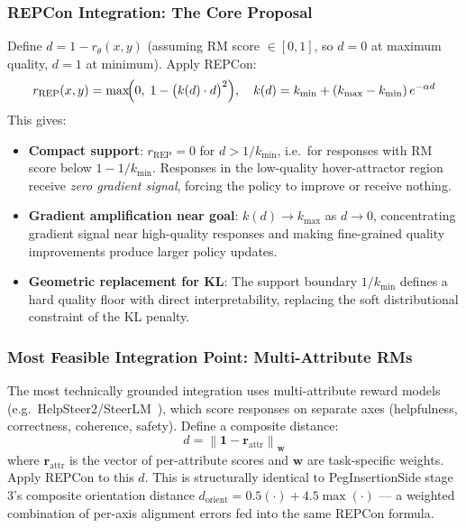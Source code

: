 \documentclass{article}
\begin{document}
\subsubsection{REPCon Integration: The Core Proposal}

Define $d = 1 - r_\theta(x,y)$ (assuming RM score $\in [0,1]$, so $d=0$ at maximum
quality, $d=1$ at minimum). Apply REPCon:
\begin{equation}
    r_\text{REP}(x,y) = \max\!\Bigl(0,\; 1 - \bigl(k(d)\cdot d\bigr)^2\Bigr),
    \quad k(d) = k_{\min} + (k_{\max}-k_{\min})\,e^{-\alpha d}
\end{equation}
This gives:
\begin{itemize}
    \item \textbf{Compact support}: $r_\text{REP} = 0$ for $d > 1/k_{\min}$, i.e.\ for
    responses with RM score below $1 - 1/k_{\min}$. Responses in the low-quality
    hover-attractor region receive \emph{zero gradient signal}, forcing the policy
    to improve or receive nothing.
    \item \textbf{Gradient amplification near goal}: $k(d) \to k_{\max}$ as $d \to 0$,
    concentrating gradient signal near high-quality responses and making fine-grained
    quality improvements produce larger policy updates.
    \item \textbf{Geometric replacement for KL}: The support boundary $1/k_{\min}$
    defines a hard quality floor with direct interpretability, replacing the soft
    distributional constraint of the KL penalty.
\end{itemize}

\subsubsection{Most Feasible Integration Point: Multi-Attribute RMs}

The most technically grounded integration uses multi-attribute reward models (e.g.\
HelpSteer2/SteerLM~\citep{ouyang2022instructgpt}), which score responses on separate
axes (helpfulness, correctness, coherence, safety). Define a composite distance:
\begin{equation}
    d = \left\| \mathbf{1} - \mathbf{r}_\text{attr} \right\|_\mathbf{w}
\end{equation}
where $\mathbf{r}_\text{attr}$ is the vector of per-attribute scores and $\mathbf{w}$
are task-specific weights. Apply REPCon to this $d$. This is structurally identical
to PegInsertionSide stage 3's composite orientation distance
$d_\text{orient} = 0.5(\cdot) + 4.5\max(\cdot)$ — a weighted combination of
per-axis alignment errors fed into the same REPCon formula.
\end{document}
